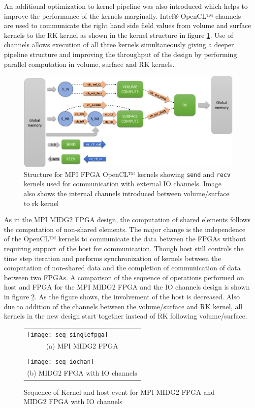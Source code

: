 An additional optimization to kernel pipeline
was also introduced which helps to improve the performance of the kernels marginally.
Intel® OpenCL™ channels are used to communicate the right hand side field values
from volume and surface kernels to the RK kernel as shown in the kernel structure
in figure \ref{fig:iochan_kernstruc}. Use of channels allows execution of all three
kernels simultaneously giving a deeper pipeline structure and improving the throughput
of the design by performing parallel computation in volume, surface and RK kernels.

\begin{figure}[h]%
    \centering
    \includegraphics[width=1.0\textwidth]{images/iochan_kernstruc}
    \caption{Structure for MPI FPGA OpenCL™ kernels showing \texttt{send} and \texttt{recv}
    kernels used for communication with external IO channels. Image also shows the internal
    channels introduced between volume/surface to rk kernel}
    \label{fig:iochan_kernstruc}
\end{figure}

As in the MPI MIDG2 FPGA design, the computation of shared elements follows the computation of
non-shared elements. The major change is the independence of the OpenCL™ kernels to
communicate the data between the FPGAs without requiring support of the host for
communication. Though host still controls the time step iteration and performs synchronization of kernels between
the computation of non-shared data and the completion of communication of data between two FPGAs.
A comparison of the sequence of operations performed on host and FPGA for the MPI MIDG2 FPGA and
the IO channels design is shown in figure \ref{fig:sequence_comp}. As the figure shows,
the involvement of the host is decreased. Also due to addition of the channels between
the volume/surface and RK kernel, all kernels in the new design start together instead
of RK following volume/surface.

\begin{figure}[h]
	\centering\small
	\begin{tabular}{l@{\hskip 0.5in}}
        \texttt{[image: seq\_singlefpga]} \\
        \multicolumn{1}{c}{(a) MPI MIDG2 FPGA}  \\
        \\
        \texttt{[image: seq\_iochan]} \\
        \multicolumn{1}{c}{(b) MIDG2 FPGA with IO channels}
	\end{tabular}
    \caption{Sequence of Kernel and host event for MPI MIDG2 FPGA
    and MIDG2 FPGA with IO channels}
	\label{fig:sequence_comp}
\end{figure}

